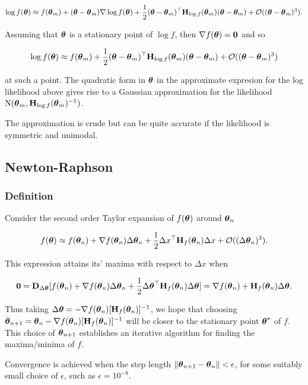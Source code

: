 \documentclass{article}[12pt]
\begin{document}
$$
\log f({\boldsymbol \theta}) \approx f({\boldsymbol \theta}_m) + ({\boldsymbol \theta} - {\boldsymbol \theta}_m) \nabla \log f({\boldsymbol \theta}) + {\frac{1}{2}} ({\boldsymbol \theta} - {\boldsymbol \theta}_m)^\top {\bf H}_{\log f}({\boldsymbol \theta}_m) ({\boldsymbol \theta} - {\boldsymbol \theta}_m) + {\mathcal O}(({\boldsymbol \theta} - {\boldsymbol \theta}_m)^3).
$$

Assuming that ${\boldsymbol \theta}$ is a stationary point of $\log f$, then $\nabla f({\boldsymbol \theta}) = {\bf 0}$ and so

$$
\log f({\boldsymbol \theta}) \approx f({\boldsymbol \theta}_m) + {\frac{1}{2}} ({\boldsymbol \theta} - {\boldsymbol \theta}_m)^\top {\bf H}_{\log f}({\boldsymbol \theta}_m) ({\boldsymbol \theta} - {\boldsymbol \theta}_m) + {\mathcal O}(({\boldsymbol \theta} - {\boldsymbol \theta}_m)^3)
$$

at such a point. The quadratic form in ${\boldsymbol \theta}$ in the approximate expresion for the log likelihood above gives 
rise to a Gaussian approximation for the likelihood $\text{N}({\boldsymbol \theta}_m, {\bf H}_{\log f}({\boldsymbol \theta}_m)^{-1})$.

The approximation is crude but can be quite accurate if the likelihood is symmetric and unimodal.

\subsection{Newton-Raphson}

\subsubsection{Definition}

Consider the second order Taylor expansion of $f({\boldsymbol \theta})$ around ${\boldsymbol \theta}_{n}$

$$
f({\boldsymbol \theta}) \approx f({\boldsymbol \theta}_{n}) + \nabla f({\boldsymbol \theta}_{n}) \Delta {\boldsymbol\theta}_{n} + {\frac{1}{2}} \Delta x^\top {\bf H}_f({\boldsymbol \theta}_{n}) \Delta x + {\mathcal O}((\Delta {\boldsymbol\theta}_{n})^3).
$$

This expression attains its' maxima with respect to $\Delta x$ when

$$
{\bf 0} = {\bf D}_{\Delta {\boldsymbol\theta}} [f({\boldsymbol \theta}_{n}) + \nabla f({\boldsymbol \theta}_{n}) \Delta {\boldsymbol\theta}_{n} + {\frac{1}{2}} \Delta {\boldsymbol\theta}^\top {\bf H}_f({\boldsymbol \theta}_{n}) \Delta {\boldsymbol\theta}] = \nabla f({\boldsymbol \theta}_n) + {\bf H}_f({\boldsymbol \theta}_n) \Delta {\boldsymbol\theta}.
$$

Thus taking $\Delta {\boldsymbol\theta} = -\nabla f({\boldsymbol \theta}_n) [{\bf H}_f({\boldsymbol \theta}_n)]^{-1}$, we hope that choosing
${\boldsymbol \theta}_{n + 1} = {\boldsymbol \theta}_{n} - \nabla f({\boldsymbol \theta}_n) [{\bf H}_f({\boldsymbol \theta}_n)]^{-1}$ will be closer to the stationary 
point ${\boldsymbol \theta}^*$ of $f$. This choice of ${\boldsymbol \theta}_{n+1}$ establishes an iterative algorithm for finding the 
maxima/minima of $f$.

Convergence is achieved when the step length $\| {\boldsymbol \theta}_{n+1} - {\boldsymbol \theta}_{n} \| < \epsilon$, for some
suitably small choice of $\epsilon$, such as $\epsilon = 10^{-8}$.
\end{document}

